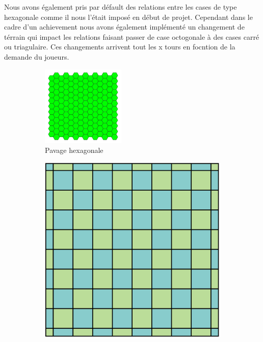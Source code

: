 \documentclass{article}
\begin{document}
\begin{itemize}
\begin{itemize}
        
        Nous avons également pris par défault des relations entre les cases de type hexagonale comme il nous l'était imposé en début de projet. Cependant dans le cadre d'un achievement nous avons également implémenté un changement de térrain qui impact les relations faisant passer de case octogonale à des cases carré ou triagulaire. Ces changements arrivent tout les x tours en focntion de la demande du joueurs.
\begin{figure}[htbp]
\centering
\begin{subfigure}{0.3\textwidth}
\centering
\includegraphics[width=\textwidth]{plateauhexa.png}
\caption{Pavage hexagonale}
\label{label_de_l_image_1}
\end{subfigure}
\quad
\begin{subfigure}{0.3\textwidth}
\centering
\includegraphics[width=\textwidth]{quadrillage.png}

\end{subfigure}
\end{figure}
\end{itemize}
\end{itemize}
\end{document}
